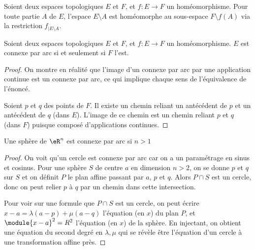 \begin{rem}Soient deux espaces topologiques $E$ et $F$, et $f :
		E\to F$ un homéomorphisme. Pour toute partie $A$ de $E$,
	l'espace $E\setminus A$ est homéomorphe au sous-espace $F\setminus
		f(A)$ via la restriction $f_{\vert E\setminus A}$.\end{rem}

\begin{lemma}Soient deux espaces topologiques $E$ et $F$, et $f :
		E\to F$ un homéomorphisme. $E$ est connexe par arc si et
	seulement si $F$ l'est.\end{lemma}
\begin{proof}On montre en réalité que l'image d'un connexe par arc
	par une application continue est un connexe par arc, ce qui
	implique chaque sens de l'équivalence de l'énoncé.

	Soient $p$ et $q$ des points de $F$. Il existe un chemin reliant
	un antécédent de $p$ et un antécédent de $q$ (dans $E$). L'image
	de ce chemin est un chemin reliant $p$ et $q$ (dans $F$) puisque
	composé d'applications continues.
\end{proof}

\begin{lemma}Une sphère de $\eR^n$ est connexe par arc si $n >
		1$\end{lemma}
\begin{proof}On voit qu'un cercle est connexe par arc car on a un
	paramétrage en sinus et cosinus. Pour une sphère $S$ de centre
	$a$ en dimension $n > 2$, on se donne $p$ et $q$ sur $S$ et on
	définit $P$ le plan affine passant par $a$, $p$ et $q$. Alors $P
		\cap S$ est un cercle, donc on peut relier $p$ à $q$ par un chemin
	dans cette intersection.

	Pour voir sur une formule que $P \cap S$ est un cercle, on peut
	écrire $x - a = \lambda(a-p) + \mu(a-q)$ l'équation (en $x$) du
	plan $P$, et $\module{x-a}^2 = R^2$ l'équation (en $x$) de la
	sphère. En injectant, on obtient une équation du second degré en
	$\lambda,\mu$ qui se révèle être l'équation d'un cercle à une
	transformation affine près.
\end{proof}

